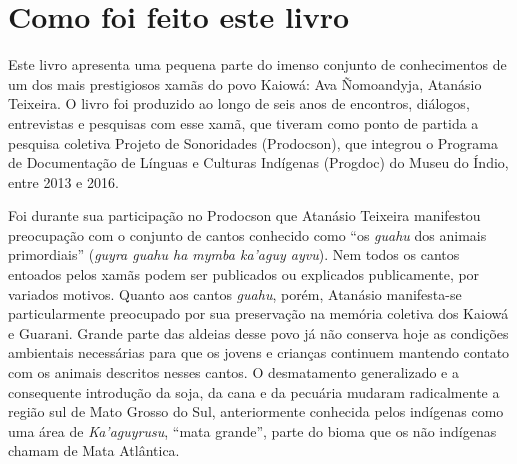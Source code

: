 \chapter{Como foi feito este livro}

Este livro apresenta uma pequena parte do imenso conjunto de
conhecimentos de um dos mais prestigiosos xamãs do povo Kaiowá: Ava
Ñomoandyja, Atanásio Teixeira. O livro foi produzido ao longo de seis
anos de encontros, diálogos, entrevistas e pesquisas com esse xamã, que
tiveram como ponto de partida a pesquisa coletiva Projeto de Sonoridades
(Prodocson), que integrou o Programa de Documentação de Línguas e
Culturas Indígenas (Progdoc) do Museu do Índio, entre 2013 e 2016.


Foi durante sua participação no Prodocson que Atanásio Teixeira
manifestou preocupação com o conjunto de cantos conhecido como ``os
\textit{guahu} dos animais primordiais'' (\textit{guyra guahu ha
mymba ka'aguy ayvu}). Nem todos os cantos entoados pelos xamãs podem ser
publicados ou explicados publicamente, por variados motivos. Quanto aos
cantos \textit{guahu}, porém, Atanásio manifesta-se particularmente
preocupado por sua preservação na memória coletiva dos Kaiowá e Guarani.
Grande parte das aldeias desse povo já não conserva hoje as condições
ambientais necessárias para que os jovens e crianças continuem mantendo
contato com os animais descritos nesses cantos. O desmatamento
generalizado e a consequente introdução da soja, da cana e da pecuária
mudaram radicalmente a região sul de Mato Grosso do Sul, anteriormente
conhecida pelos indígenas como uma área de \textit{Ka'aguyrusu}, ``mata
grande'', parte do bioma que os não indígenas chamam de Mata Atlântica.

